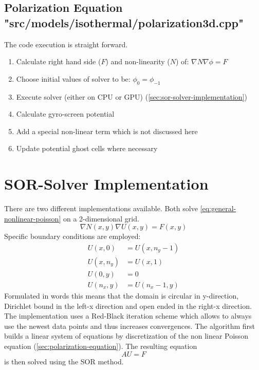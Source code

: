 \subsection{Polarization Equation {\small "src/models/isothermal/polarization3d.cpp"}}
\label{sec:components-polarization}
The code execution is straight forward.
\begin{enumerate}
    \item Calculate right hand side ($F$) and non-linearity ($N$) of: $\nabla N \nabla \phi = F$
     \item Choose initial values of solver to be: $\phi_0 = \phi_{-1}$
    \item Execute solver (either on CPU or GPU) (\autoref{sec:sor-solver-implementation})
    \item Calculate gyro-screen potential
    \item Add a special non-linear term which is not discussed here
    \item Update potential ghost cells where necessary
\end{enumerate}


\section{SOR-Solver Implementation}
\label{sec:sor-solver-implementation}
There are two different implementations available. Both solve \autoref{eq:general-nonlinear-poisson} on a 2-dimensional grid.
\begin{equation}
    \nabla N(x,y)\nabla U(x,y) = F(x,y)\label{eq:general-nonlinear-poisson}
\end{equation}
Specific boundary conditions are employed:
\begin{equation}
    \begin{split}
        U(x, 0) &= U(x, n_y - 1) \\
        U(x, n_y) &= U(x, 1)\\
        U(0, y) &= 0\\
        U(n_x, y) &= U(n_x - 1, y)
    \end{split}
\end{equation}
Formulated in words this means that the domain is circular in y-direction, Dirichlet bound in the left-x direction and open ended in the right-x direction.
The implementation uses a Red-Black iteration scheme which allows to always use the newest data points and thus increases convergences. The algorithm first builds a linear system of equations by discretization of the non linear Poisson equation (\autoref{sec:polarization-equation}). The resulting equation
\begin{equation*}
    AU = F
\end{equation*}
is then solved using the \ac{SOR} \cite{SORPaper} method.

